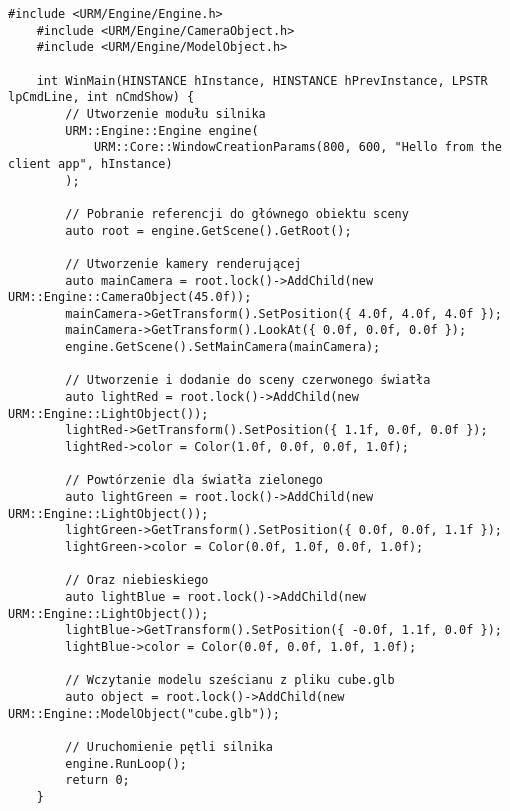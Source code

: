 \begin{lstlisting}[caption={Aplikacja przykładowa wykorzystująca API modułu silnika}, label={lst:appendix:engineDemo}]
	#include <URM/Engine/Engine.h>
	#include <URM/Engine/CameraObject.h>
	#include <URM/Engine/ModelObject.h>
	
	int WinMain(HINSTANCE hInstance, HINSTANCE hPrevInstance, LPSTR lpCmdLine, int nCmdShow) {
		// Utworzenie modułu silnika
		URM::Engine::Engine engine(
			URM::Core::WindowCreationParams(800, 600, "Hello from the client app", hInstance)
		);
		
		// Pobranie referencji do głównego obiektu sceny
		auto root = engine.GetScene().GetRoot();
		
		// Utworzenie kamery renderującej
		auto mainCamera = root.lock()->AddChild(new URM::Engine::CameraObject(45.0f));
		mainCamera->GetTransform().SetPosition({ 4.0f, 4.0f, 4.0f });
		mainCamera->GetTransform().LookAt({ 0.0f, 0.0f, 0.0f });
		engine.GetScene().SetMainCamera(mainCamera);
		
		// Utworzenie i dodanie do sceny czerwonego światła
		auto lightRed = root.lock()->AddChild(new URM::Engine::LightObject());
		lightRed->GetTransform().SetPosition({ 1.1f, 0.0f, 0.0f });
		lightRed->color = Color(1.0f, 0.0f, 0.0f, 1.0f);
		
		// Powtórzenie dla światła zielonego
		auto lightGreen = root.lock()->AddChild(new URM::Engine::LightObject());
		lightGreen->GetTransform().SetPosition({ 0.0f, 0.0f, 1.1f });
		lightGreen->color = Color(0.0f, 1.0f, 0.0f, 1.0f);
		
		// Oraz niebieskiego
		auto lightBlue = root.lock()->AddChild(new URM::Engine::LightObject());
		lightBlue->GetTransform().SetPosition({ -0.0f, 1.1f, 0.0f });
		lightBlue->color = Color(0.0f, 0.0f, 1.0f, 1.0f);
		
		// Wczytanie modelu sześcianu z pliku cube.glb
		auto object = root.lock()->AddChild(new URM::Engine::ModelObject("cube.glb"));
		
		// Uruchomienie pętli silnika
		engine.RunLoop();
		return 0;
	}
\end{lstlisting}